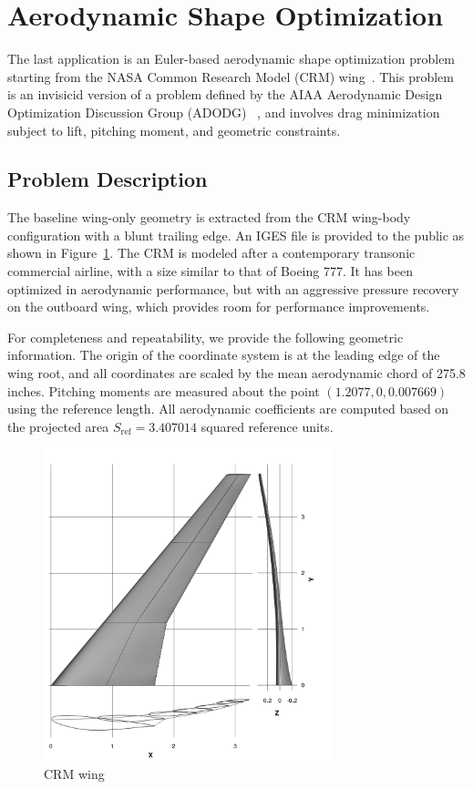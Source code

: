 \section{Aerodynamic Shape Optimization}

The last application is an Euler-based aerodynamic shape optimization problem starting from the NASA Common Research Model (CRM) wing~\cite{crm_wing}. This problem is an invisicid version of a problem defined by
the AIAA Aerodynamic Design Optimization Discussion Group (ADODG) ~\cite{adodg}, and involves drag minimization subject to lift, pitching moment, and geometric constraints.   

\subsection{Problem Description}
The baseline wing-only geometry is extracted from the CRM wing-body configuration with a blunt trailing edge. An IGES file is provided to the public as shown in Figure~\ref{fig:crm_wing}. The CRM is modeled after a contemporary transonic commercial airline, with a size similar to that of Boeing 777. It has been optimized in aerodynamic performance, but with an aggressive pressure recovery on the outboard wing, which provides room for performance improvements. 

For completeness and repeatability, we provide the following geometric information. 
The origin of the coordinate system is at the leading edge of the wing root, and all coordinates are scaled by the mean aerodynamic chord of 275.8 inches. Pitching moments are measured about the point $(1.2077, 0, 0.007669)$ using the reference length. All aerodynamic coefficients are computed based on the projected area $S_{\text{ref}}=3.407014$ squared reference units. 

\begin{figure}[tbp]
  \centering
  \includegraphics[clip,width=0.75\textwidth]{./figs/chap7_aso/CRM-wing.png}%
  \caption{CRM wing \label{fig:crm_wing}}
\end{figure}


